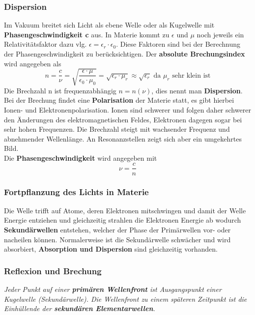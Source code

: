 \documentclass[12pt,a4paper,ngerman]{article}
\begin{document}
\subsubsection*{Dispersion}
Im Vakuum breitet sich Licht als ebene Welle oder als Kugelwelle mit \textbf{Phasengeschwindigkeit c} aus. In Materie kommt zu $\epsilon$ und $\mu$ noch jeweils ein Relativitätsfaktor dazu vlg. $\epsilon = \epsilon_r \cdot \epsilon_0$. Diese Faktoren sind bei der Berechnung der Phasengeschwindigkeit zu berücksichtigen. 
Der \textbf{absolute Brechungsindex} wird angegeben als
\begin{equation}
n = \frac{c}{\nu} = \sqrt{\frac{\epsilon\cdot\mu}{\epsilon_0\cdot\mu_0}} = \sqrt{\epsilon_r \cdot \mu_r} \approx \sqrt{\epsilon_r} \text{ da } \mu_r \text{ sehr klein ist}
\end{equation}
Die Brechzahl n ist frequenzabhängig $n = n(\nu)$, dies nennt man \textbf{Dispersion}.  
\pagebreak
\\
Bei der Brechung findet eine \textbf{Polarisation} der Materie statt, es gibt hierbei Ionen- und Elektronenpolarisation. Ionen sind schwerer und folgen daher schwerer den Änderungen des elektromagnetischen Feldes, Elektronen dagegen sogar bei sehr hohen Frequenzen. Die Brechzahl steigt mit wachsender Frequenz und abnehmender Wellenlänge. An Resonanzstellen zeigt sich aber ein umgekehrtes Bild. \\
Die \textbf{Phasengeschwindigkeit} wird angegeben mit 
\begin{equation}
\nu = \frac{c}{n}
\end{equation}
\subsubsection*{Fortpflanzung des Lichts in Materie}
Die Welle trifft auf Atome, deren Elektronen mitschwingen und damit der Welle Energie entziehen und gleichzeitig strahlen die Elektronen Energie ab wodurch \textbf{Sekundärwellen} entstehen, welcher der Phase der Primärwellen vor- oder nacheilen können. Normalerweise ist die Sekundärwelle schwächer und wird absorbiert, \textbf{Absorption und Dispersion} sind gleichzeitig vorhanden. 
\subsubsection*{Reflexion und Brechung}
\begin{center}
\textit{Jeder Punkt auf einer \textbf{primären Wellenfront} ist Ausgangspunkt einer Kugelwelle (Sekundärwelle). Die Wellenfront zu einem späteren Zeitpunkt ist die Einhüllende der \textbf{sekundären Elementarwellen}.}
\end{center}
\end{document}
